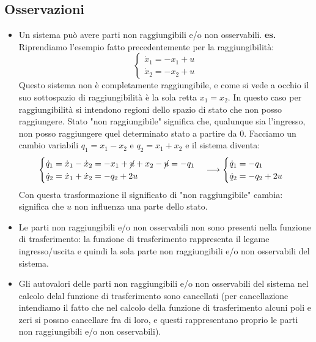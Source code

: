 \subsection{Osservazioni}
\begin{itemize}
    \item Un sistema può avere parti non raggiungibili e/o non osservabili.\newline
    \newline
    \textbf{es.} Riprendiamo l'esempio fatto precedentemente per la raggiungibilità: \[\begin{cases}
            \dot{x}_1 = -x_1 +u\\
            \dot{x}_2 = -x_2 +u
        \end{cases}
        \] 
        Questo sistema non è completamente raggiungibile, e come si vede a occhio il suo sottospazio di raggiungibilità è la sola retta $x_1 = x_2$. In questo caso per raggiungibilità si intendono regioni dello spazio di stato che non posso raggiungere. Stato "non raggiungibile" significa che, qualunque sia l'ingresso, non posso raggiungere quel determinato stato a partire da $0$.\newline
        Facciamo un cambio variabili $q_1 = x_1 - x_2$ e $q_2 = x_1 + x_2$ e il sistema diventa: \[
            \begin{cases}
                \dot{q}_1 = \dot{x}_1 - \dot{x}_2 = - x_1 + \cancel{u} + x_2 - \cancel{u} = - q_1\\
                \dot{q}_2 = \dot{x}_1 + \dot{x}_2 = - q_2 + 2 u
            \end{cases} \longrightarrow \begin{cases}
                \dot{q}_1 = -q_1\\
                \dot{q}_2 = -q_2 + 2u
            \end{cases}
        \]
        Con questa trasformazione il significato di "non raggiungibile" cambia: significa che $u$ non influenza una parte dello stato.
        \item Le parti non raggiungibili e/o non osservabili non sono presenti nella funzione di trasferimento: la funzione di trasferimento rappresenta il legame ingresso/uscita e quindi la sola parte non raggiungibili e/o non osservabili del sistema.
        \item Gli autovalori delle parti non raggiungibili e/o non osservabili del sistema nel calcolo delal funzione di trasferimento sono cancellati (per cancellazione intendiamo il fatto che nel calcolo della funzione di trasferimento alcuni poli e zeri si possno cancellare fra di loro, e questi rappresentano proprio le parti non raggiungibili e/o non osservabili).
\end{itemize}
